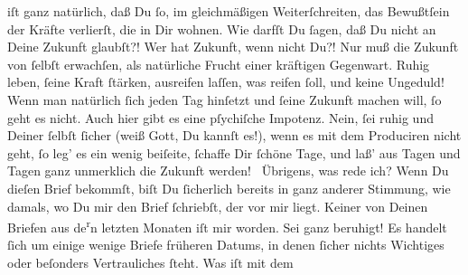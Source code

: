 \begin{ledgroupsized}[t]{13cm}
               iſt ganz natürlich, daß Du ſo, im gleichmäßigen {\pb}Weiterſchreiten, das Bewußtſein der Kräfte verlierſt, die in Dir wohnen.\pend
           \pstart
           Wie darfſt Du ſagen, daß Du nicht an Deine Zukunft glaubſt?! Wer hat Zukunft, wenn
               nicht Du?! Nur muß die Zukunft von ſelbſt erwachſen, als natürliche Frucht einer
               kräftigen Gegenwart. Ruhig leben, ſeine Kraft ſtärken, ausreifen laſſen, was reifen
               ſoll, und keine Ungeduld! Wenn man natürlich ſich jeden Tag hinſetzt und ſeine
               Zukunft machen will, ſo geht es nicht. Auch hier gibt es  eine pſychiſche Impotenz. Nein, ſei ruhig und Deiner ſelbſt ſicher (weiß Gott,
               Du kannſt es!), {\pb}wenn es mit  dem Produciren nicht geht, ſo leg’ es ein wenig
               beiſeite, ſchaffe Dir ſchöne Tage, und laß’ aus Tagen und Tagen ganz unmerklich die
               Zukunft werden! {\dotsfour}\pend
           \pstart
           Übrigens, was rede ich? Wenn Du dieſen Brief bekommſt, biſt Du ſicherlich bereits in
               ganz anderer Stimmung, wie damals, wo Du mir  den
               Brief ſchriebſt, der vor mir liegt.\pend
           \pstart
           Keiner von Deinen Briefen aus de\substVorne{}\textsuperscript{r}\substDazwischen{}n\substHinten{} letzten Monaten iſt mir \label{K_L02834-3v}\label{K_L02834-3h} worden. Sei ganz beruhigt! Es handelt ſich um einige wenige Briefe früheren
               Datums, in denen ſicher nichts Wichtiges oder beſonders Vertrauliches ſteht.\pend
           \pstart
           {\pb}Was iſt mit dem \label{K_L02834-4v}
\end{ledgroupsized}
